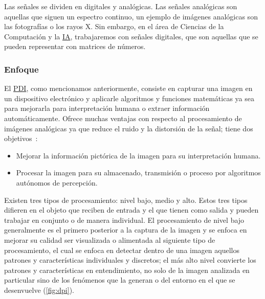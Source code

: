 Las señales se dividen en digitales y analógicas. Las señales analógicas son
aquellas que siguen un espectro continuo, un ejemplo de imágenes analógicas son
las fotografías o los rayos X. Sin embargo, en el área de Ciencias de la
Computación y la \hyperlink{abbr}{IA}, trabajaremos con señales digitales, que
son aquellas que se pueden representar con matrices de números.

\subsubsection{Enfoque}

El \hyperlink{abbr}{PDI}, como mencionamos anteriormente, consiste en capturar
una imagen en un dispositivo electrónico y aplicarle algoritmos y funciones
matemáticas ya sea para mejorarla para interpretación humana o extraer
información automáticamente. Ofrece muchas ventajas con respecto al
procesamiento de imágenes analógicas ya que reduce el ruido y la distorsión de
la señal; tiene dos objetivos~\cite{Forsyth2012}:

\begin{minipage}{\textwidth}
\begin{itemize}
    \item Mejorar la información pictórica de la imagen para su interpretación
    humana.
    \item Procesar la imagen para su almacenado, transmisión o proceso por
    algoritmos autónomos de percepción.
\end{itemize}
\end{minipage}

Existen tres tipos de procesamiento: nivel bajo, medio y alto. Estos tres tipos
difieren en el objeto que reciben de entrada y el que tienen como salida y
pueden trabajar en conjunto o de manera individual. El procesamiento de nivel
bajo generalmente es el primero posterior a la captura de la imagen y se enfoca
en mejorar su calidad ser visualizada o alimentada al siguiente tipo de
procesamiento, el cual se enfoca en detectar dentro de una imagen aquellos
patrones y características individuales y discretos; el más alto nivel convierte
los patrones y características en entendimiento, no solo de la imagen analizada
en particular sino de los fenómenos que la generan o del entorno en el que se
desenvuelve (\autoref{fig:dpi}). 

